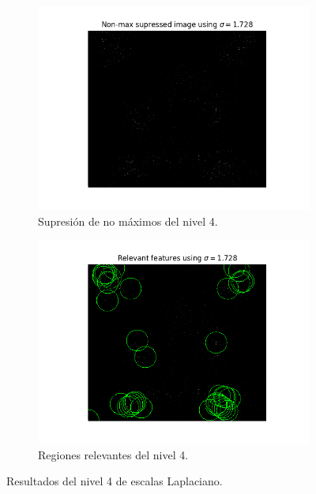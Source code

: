 \documentclass[11pt,a4paper]{article}
\begin{document}
\begin{figure}[H]
\begin{subfigure}{.5\linewidth}
	\centering
	\includegraphics[scale=0.5]{img/non-max4.png}
	\caption{Supresión de no máximos del nivel 4.}
	\label{fig:non-max4}
\end{subfigure}
\begin{subfigure}{.5\linewidth}
	\centering
	\includegraphics[scale=0.5]{img/features4.png}
	\caption{Regiones relevantes del nivel 4.}
	\label{fig:features4}
\end{subfigure}
\caption{Resultados del nivel 4 de escalas Laplaciano.}
\label{fig:lap-scale-space4}
\end{figure}
\end{document}
